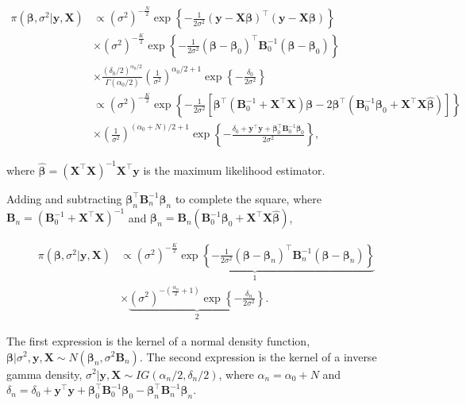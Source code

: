 \begin{align*}
	\pi(\bm{\beta},\sigma^2|\bm{y},\bm{X})&\propto (\sigma^2)^{-\frac{N}{2}} \exp \left\{-\frac{1}{2\sigma^2} ({\bm{y}} - {\bm{X}}\bm{\beta})^{\top}({\bm{y}} - {\bm{X}}\bm{\beta}) \right\} \\
	& \times (\sigma^2)^{-\frac{K}{2}} \exp \left\{-\frac{1}{2\sigma^2} (\bm{\beta} - \bm{\beta}_0)^{\top}{\bm{B}}_0^{-1}(\bm{\beta} - \bm{\beta}_0)\right\} \\
	& \times \frac{(\delta_0/2)^{\alpha_0/2}}{\Gamma(\alpha_0/2)}\left(\frac{1}{\sigma^2}\right)^{\alpha_0/2+1}\exp \left\{-\frac{\delta_0}{2\sigma^2} \right\} \\
	& \propto (\sigma^2)^{-\frac{K}{2}} \exp \left\{-\frac{1}{2\sigma^2} [\bm{\beta}^{\top}({\bm{B}}_0^{-1} + {\bm{X}}^{\top}{\bm{X}})\bm{\beta} - 2\bm{\beta}^{\top}({\bm{B}}_0^{-1}\bm{\beta}_0 + {\bm{X}}^{\top}{\bm{X}}\hat{\bm{\beta}})] \right\} \\
	& \times \left(\frac{1}{\sigma^2}\right)^{(\alpha_0+N)/2+1}\exp \left\{-\frac{\delta_0+ {\bm{y}}^{\top}{\bm{y}} + \bm{\beta}_0^{\top}{\bm{B}}_0^{-1}\bm{\beta}_0}{2\sigma^2} \right\},
\end{align*}

where $\hat{\bm{\beta}}=({\bm{X}}^{\top}{\bm{X}})^{-1}{\bm{X}}^{\top}{\bm{y}}$ is the maximum likelihood estimator.

Adding and subtracting $\bm{\beta}_n^{\top}{{\bm{B}}}_n^{-1} \bm{\beta}_n$ to complete the square, where $\bm{B}_n = (\bm{B}_0^{-1} + \bm{X}^{\top}\bm{X})^{-1}$ and $\bm{\beta}_n = \bm{B}_n(\bm{B}_0^{-1}\bm{\beta}_0 + \bm{X}^{\top}\bm{X}\hat{\bm{\beta}})$,

\begin{align*}
	\pi(\bm{\beta},\sigma^2|\bm{y},\bm{X})&\propto \underbrace{(\sigma^2)^{-\frac{K}{2}} \exp \left\{-\frac{1}{2\sigma^2} (\bm{\beta}-\bm{\beta}_n)^{\top}{\bm{B}}^{-1}_n(\bm{\beta}-\bm{\beta}_n) \right\}}_1 \\
	& \times \underbrace{(\sigma^2)^{-\left(\frac{\alpha_n}{2}+1 \right)} \exp \left\{-\frac{\delta_n}{2\sigma^2} \right\}}_2.
\end{align*}

The first expression is the kernel of a normal density function, $\bm{\beta}|\sigma^2, \bm{y}, \bm{X} \sim N(\bm{\beta}_n, \sigma^2\bm{B}_n)$. The second expression is the kernel of a inverse gamma density,	$\sigma^2| \bm{y}, \bm{X}\sim IG(\alpha_n/2, \delta_n/2)$, where $\alpha_n = \alpha_0 + N$ and $\delta_n = \delta_0 + \bm{y}^{\top}\bm{y} + \bm{\beta}_0^{\top}\bm{B}_0^{-1}\bm{\beta}_0 - \bm{\beta}_n^{\top}\bm{B}_n^{-1}\bm{\beta}_n$.

